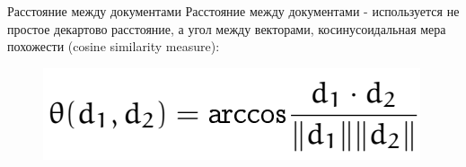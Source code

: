 \begin{frame}{Расстояние между документами}
Расстояние между документами - используется не простое декартово расстояние, а угол между векторами, косинусоидальная мера похожести (cosine similarity measure):
\begin{figure}[h]
\centering
\includegraphics[scale=0.4]{images/lec07-pic14.png}
\end{figure}
\end{frame}